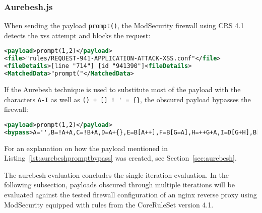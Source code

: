 \subsubsection{Aurebesh.js}
\label{sec:aurebeshevaluation}
When sending the payload \verb|prompt()|, the ModSecurity firewall using CRS 4.1 detects the \gls{xss} attempt and blocks the request:
\begin{lstlisting}[style=ruleStyle, language=XML, caption=prompt(1\,2) blocked, label=lst:promptblocked]
<payload>prompt(1,2)</payload>
<file>"rules/REQUEST-941-APPLICATION-ATTACK-XSS.conf"</file>
<fileDetails>[line "714"] [id "941390"]<fileDetails>
<MatchedData>"prompt("</MatchedData>
\end{lstlisting}
If the Aurebesh technique is used to substitute most of the payload with the characters \verb|A-I| as well as \verb|() + [] ! ' = {}|, the obscured payload bypasses the firewall:
\begin{lstlisting}[style=ruleStyle, language=XML, caption=Aurebesh prompt bypass, label=lst:aurebeshpromptbypass]
<payload>prompt(1,2)</payload>
<bypass>A='',B=!A+A,C=!B+A,D=A+{},E=B[A++],F=B[G=A],H=++G+A,I=D[G+H],B[I+=D[A]+(B.C+D)[A]+C[H]+E+F+B[G]+I+E+D[A]+F][I]('p'+F+D[A]+'m'+'p'+E+'(A,++A)')()</bypass>
\end{lstlisting}

For an explanation on how the payload mentioned in Listing~\ref{lst:aurebeshpromptbypass} was created, see Section~\ref{sec:aurebesh}.

The aurebesh evaluation concludes the single iteration evaluation. In the following subsection, payloads obscured through multiple iterations will be evaluated against the tested firewall configuration of an nginx reverse proxy using ModSecurity equipped with rules from the CoreRuleSet version 4.1.


